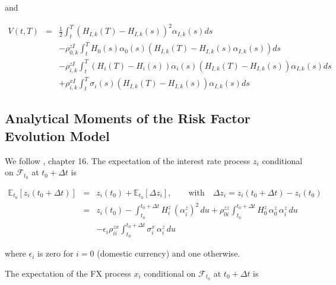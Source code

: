 \documentclass[12pt, a4paper]{article}
\begin{document}
\begin{appendix}
and

\begin{eqnarray*}
  V(t,T) &=& \frac{1}{2}\int_t^T (H_{I,k}(T)-H_{I,k}(s))^2 \alpha_{I,k}(s) ds \\
  & & -\rho^{zI}_{0,k} \int_t^T H_0(s)\alpha_0(s)(H_{I,k}(T)-H_{I,k}(s)\alpha_{I,k}(s)) ds \\
  & & -\rho^{zI}_{i,k} \int_t^T (H_i(T)-H_i(s))\alpha_i(s)(H_{I,k}(T)-H_{I,k}(s))\alpha_{I,k}(s) ds \\
  & & +\rho^{xI}_{i,k} \int_t^T \sigma_i(s)(H_{I,k}(T)-H_{I,k}(s))\alpha_{I,k}(s) ds
\end{eqnarray*}

\subsection{Analytical Moments of the Risk Factor Evolution Model}\label{sec:app_analytical_moments}

We follow \cite{Lichters}, chapter 16. The expectation of the interest rate process $z_i$ conditional on $\mathcal{F}_{t_0}$ at $t_0+\Delta t$ is

\begin{eqnarray*}
  \mathbb{E}_{t_0}[z_i(t_0+\Delta t)] &=& z_i(t_0) + \mathbb{E}_{t_0}[\Delta z_i],
  \qquad\mbox{with}\quad \Delta z_i = z_i(t_0+\Delta t) - z_i(t_0) \\
  &=& z_i(t_0) -\int_{t_0}^{t_0+\Delta t} H^z_i\,(\alpha^z_i)^2\,du + \rho^{zz}_{0i} \int_{t_0}^{t_0+\Delta t}
  H^z_0\,\alpha^z_0\,\alpha^z_i\,du \\
  & & - \epsilon_i  \rho^{zx}_{ii}\int_{t_0}^{t_0+\Delta t} \sigma_i^x\,\alpha^z_i\,du
\end{eqnarray*}

where $\epsilon_i$ is zero for $i=0$ (domestic currency) and one otherwise.

\bigskip

The expectation of the FX process $x_i$ conditional on $\mathcal{F}_{t_0}$ at $t_0+\Delta t$ is


\end{appendix}
\end{document}
